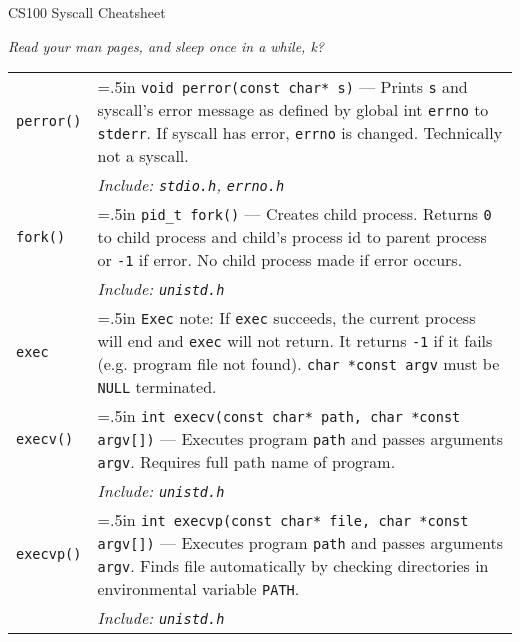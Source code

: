 \documentclass{article}
\newcommand{\indenth}[1][.5]{\hangindent=#1in
                         \hangafter=1 }
\begin{document}
\begin{center}
\huge CS100 Syscall Cheatsheet

\bigskip\it\large Read your man pages, and sleep once in a while, k?\rm
\end{center}

\normalsize
\begin{longtabu}{|p{.9in}|p{6.3in}<{\strut}|} 
\hline\endhead
    \texttt{perror()} & \indenth\texttt{void perror(const char* s)} --- Prints \texttt{s} and syscall's error message as defined by global int \texttt{errno} to \texttt{stderr}. If syscall has error, \texttt{errno} is changed. Technically not a syscall.
        \\ 
    & \hspace{.5in}\it Include: \rm\texttt{stdio.h}, \texttt{errno.h}
        \\ \hline%
    \texttt{fork()} &  \indenth\texttt{pid\_t fork()} --- Creates child process. Returns \texttt{0} to child process and child's process id to parent process or \texttt{-1} if error. No child process made if error occurs.
        \\
    & \hspace{.5in}\it Include: \rm\texttt{unistd.h}
        \\ %
    \texttt{exec} & \indenth\texttt{Exec} note: If \texttt{exec} succeeds, the current process will end and \texttt{exec} will not return. It returns \texttt{-1} if it fails (e.g. program file not found). \texttt{char *const argv} must be \texttt{NULL} terminated. \par
        \\ 
    \texttt{execv()} & \indenth\texttt{int execv(const char* path, char *const argv[])} --- Executes program \texttt{path} and passes arguments \texttt{argv}. Requires full path name of program.
        \\
    & \hspace{.5in}\it Include: \rm\texttt{unistd.h}
        \\
    \texttt{execvp()} & \indenth\texttt{int execvp(const char* file, char *const argv[])} --- Executes program \texttt{path} and passes arguments \texttt{argv}. Finds file automatically by checking directories in environmental variable \texttt{PATH}.
        \\
    & \hspace{.5in}\it Include: \rm\texttt{unistd.h}
        \\ %

\end{longtabu}
\end{document}
